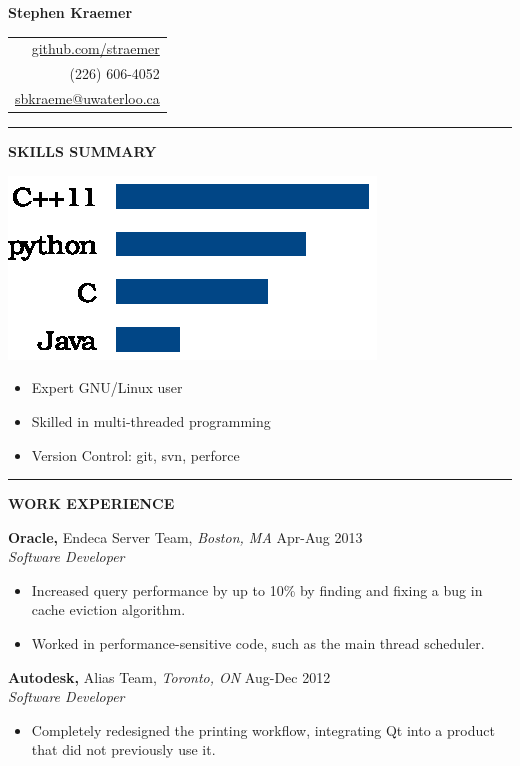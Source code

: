 \documentclass{letter}
\begin{document}
{\Huge\bf Stephen Kraemer} \hfill
\begin{tabular}{r}
  \href{https://github.com/straemer}{github.com/straemer} \\
  (226) 606-4052 \\
  \href{mailto:sbkraeme@uwaterloo.ca}{sbkraeme@uwaterloo.ca}
\end{tabular}

\vskip 2pt
\hrule

{\large\bf SKILLS SUMMARY}

\begin{minipage}{0.35\textwidth}
  \includegraphics{programming_languages.eps}
\end{minipage}
\begin{minipage}{0.65\textwidth}
  \begin{itemize}
    \item Expert GNU/Linux user
    \item Skilled in multi-threaded programming
    \item Version Control: git, svn, perforce
  \end{itemize}
\end{minipage}

\vskip 2pt
\hrule
{\large\bf WORK EXPERIENCE}

{\bf Oracle,} Endeca Server Team, {\sl Boston, MA} \hfill Apr-Aug 2013 \\
{\sl Software Developer}
\begin{itemize}
  \item Increased query performance by up to 10\% by finding and fixing a bug in cache eviction algorithm.
  \item Worked in performance-sensitive code, such as the main thread scheduler.
\end{itemize}

{\bf Autodesk,} Alias Team, {\sl Toronto, ON} \hfill Aug-Dec 2012 \\
{\sl Software Developer}
\begin{itemize}
  \item Completely redesigned the printing workflow, integrating Qt into a product that did not previously use it.
\end{itemize}
\end{document}
